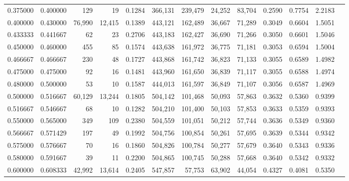 \begin{tabular}{rrrrrrrrrrrrr}
0.375000 & 0.400000 &    129 &     19 &                                     0.1284 & 366,131 & 239,479 &  24,252 &  83,704 & 0.2590 & 0.7754 & 2.2183 \\
0.400000 & 0.430000 & 76,990 & 12,415 &                                     0.1389 & 443,121 & 162,489 &  36,667 &  71,289 & 0.3049 & 0.6604 & 1.5051 \\
0.433333 & 0.441667 &     62 &     23 &                                     0.2706 & 443,183 & 162,427 &  36,690 &  71,266 & 0.3050 & 0.6601 & 1.5046 \\
0.450000 & 0.460000 &    455 &     85 &                                     0.1574 & 443,638 & 161,972 &  36,775 &  71,181 & 0.3053 & 0.6594 & 1.5004 \\
0.466667 & 0.466667 &    230 &     48 &                                     0.1727 & 443,868 & 161,742 &  36,823 &  71,133 & 0.3055 & 0.6589 & 1.4982 \\
0.475000 & 0.475000 &     92 &     16 &                                     0.1481 & 443,960 & 161,650 &  36,839 &  71,117 & 0.3055 & 0.6588 & 1.4974 \\
0.480000 & 0.500000 &     53 &     10 &                                     0.1587 & 444,013 & 161,597 &  36,849 &  71,107 & 0.3056 & 0.6587 & 1.4969 \\
0.500000 & 0.516667 & 60,129 & 13,244 &                                     0.1805 & 504,142 & 101,468 &  50,093 &  57,863 & 0.3632 & 0.5360 & 0.9399 \\
0.516667 & 0.546667 &     68 &     10 &                                     0.1282 & 504,210 & 101,400 &  50,103 &  57,853 & 0.3633 & 0.5359 & 0.9393 \\
0.550000 & 0.565000 &    349 &    109 &                                     0.2380 & 504,559 & 101,051 &  50,212 &  57,744 & 0.3636 & 0.5349 & 0.9360 \\
0.566667 & 0.571429 &    197 &     49 &                                     0.1992 & 504,756 & 100,854 &  50,261 &  57,695 & 0.3639 & 0.5344 & 0.9342 \\
0.575000 & 0.576667 &     70 &     16 &                                     0.1860 & 504,826 & 100,784 &  50,277 &  57,679 & 0.3640 & 0.5343 & 0.9336 \\
0.580000 & 0.591667 &     39 &     11 &                                     0.2200 & 504,865 & 100,745 &  50,288 &  57,668 & 0.3640 & 0.5342 & 0.9332 \\
0.600000 & 0.608333 & 42,992 & 13,614 &                                     0.2405 & 547,857 &  57,753 &  63,902 &  44,054 & 0.4327 & 0.4081 & 0.5350 \\

\end{tabular}

